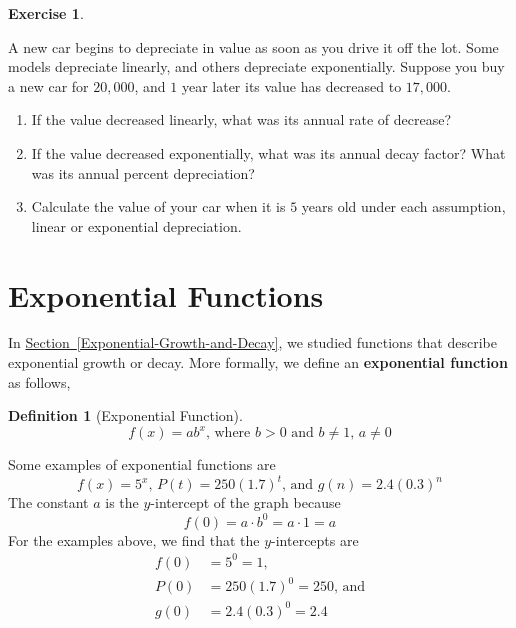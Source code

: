 \documentclass[10pt,]{book}
\newcommand{\terminology}[1]{\textbf{#1}}
\theoremstyle{plain}
\theoremstyle{definition}
\newtheorem{definition}[theorem]{Definition}
\theoremstyle{definition}
\theoremstyle{definition}
\theoremstyle{definition}
\theoremstyle{definition}
\newtheorem{exercise}[theorem]{Exercise}
\numberwithin{equation}{section}
\newcommand{\gt}{ > }
\newcommand{\amp}{ & }
\begin{document}
\begin{exercise}\label{exercise-depreciation}

A new car begins to depreciate in value as soon as you drive it off the lot. Some models depreciate linearly, and others depreciate exponentially. Suppose you buy a new car for \textdollar{}\(20,000\), and \(1\) year later its value has decreased to \textdollar{}\(17,000\).
\leavevmode%
\begin{enumerate}[label=*\alph**]
\item\hypertarget{li-654}{}
        If the value decreased linearly, what was its annual rate of decrease?
    \item\hypertarget{li-655}{}
        If the value decreased exponentially, what was its annual decay factor? What was its annual percent depreciation?
    \item\hypertarget{li-656}{}
        Calculate the value of your car when it is \(5\) years old under each assumption, linear or exponential depreciation.
    \end{enumerate}
\end{exercise}
\typeout{************************************************}
\typeout{************************************************}
\section[Exponential Functions]{Exponential Functions}\label{Exponential-Functions}

	In \hyperref[Exponential-Growth-and-Decay]{Section~\ref{Exponential-Growth-and-Decay}}, we studied functions that describe exponential growth or decay. More formally, we define an \terminology{exponential function} as follows,
%
\begin{definition}[Exponential Function]\label{definition-9}
\begin{equation*}f(x) = ab^x \text{, where } b \gt 0 \text{ and } b \ne 1 \text{, } a \ne 0\end{equation*}\end{definition}
\par

	Some examples of exponential functions are
	\begin{equation*}f (x) = 5^x \text{, } P(t) = 250(1.7)^t \text{, and } g(n) = 2.4(0.3)^n\end{equation*}
	The constant \(a\) is the \(y\)-intercept of the graph because
	\begin{equation*}f (0) = a \cdot b^0 = a \cdot 1 = a\end{equation*}
	For the examples above, we find that the \(y\)-intercepts are
	\begin{align*}
	f(0) \amp= 5^0 = 1 \text{,} \\
	P(0) \amp= 250(1.7)^0 = 250\text{, and} \\
	g(0) \amp= 2.4(0.3)^0 = 2.4
	\end{align*}
%
\par
\end{document}
